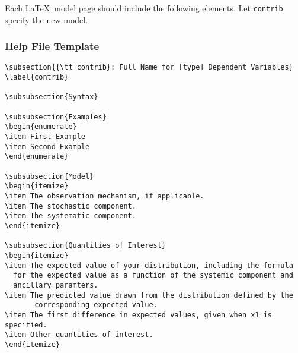 \begin{itemize}
Each \LaTeX\ model page should include the following elements.  Let
{\tt contrib} specify the new model.

\subsubsection*{Help File Template}
\begin{verbatim}
\subsection{{\tt contrib}: Full Name for [type] Dependent Variables}
\label{contrib}

\subsubsection{Syntax}

\subsubsection{Examples}
\begin{enumerate}
\item First Example
\item Second Example
\end{enumerate}

\subsubsection{Model}
\begin{itemize}
\item The observation mechanism, if applicable.
\item The stochastic component.
\item The systematic component.
\end{itemize}

\subsubsection{Quantities of Interest}
\begin{itemize}
\item The expected value of your distribution, including the formula
  for the expected value as a function of the systemic component and
  ancillary paramters.  
\item The predicted value drawn from the distribution defined by the
       corresponding expected value.  
\item The first difference in expected values, given when x1 is specified.  
\item Other quantities of interest.
\end{itemize}


\end{verbatim}
\end{itemize}
